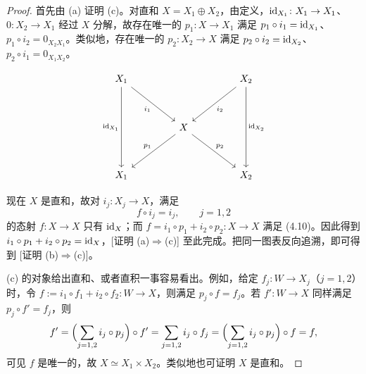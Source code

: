 \begin{proof}
首先由 (a) 证明 (c)。对直和 $X=X_1\oplus X_2$，由定义，$\mathrm{id}_{X_1}\colon X_1\to X_1$、$0\colon X_2\to X_1$ 经过 $X$ 分解，故存在唯一的 $p_1\colon X\to X_1$ 满足 $p_1\circ i_1=\mathrm{id}_{X_1}$、$p_1\circ i_2=0_{X_2X_1}$。类似地，存在唯一的 $p_2\colon X_2\to X$ 满足 $p_2\circ i_2=\mathrm{id}_{X_2}$、$p_2\circ i_1=0_{X_1X_2}$。

\[\begin{tikzcd}[row sep=3.4em, column sep=4.4em]
  X_1 \arrow[dr,"i_1"'] \arrow[dd,"\id_{X_1}"'] & & X_2 \arrow[dl,"i_2"] \arrow[dd,"\id_{X_2}"] \\
  & X \arrow[dl,"p_1"'] \arrow[dr,"p_2"] & \\
  X_1 & & X_2
\end{tikzcd}\]

现在 $X$ 是直和，故对 $i_j\colon X_j\to X$，满足
\begin{equation}
  f\circ i_j=i_j,\qquad j=1,2 \tag{4.10}
\end{equation}
的态射 $f\colon X\to X$ 只有 $\mathrm{id}_X$；而 $f=i_1\circ p_1+i_2\circ p_2\colon X\to X$ 满足 (4.10)。因此得到 $i_1\circ p_1+i_2\circ p_2=\mathrm{id}_X$，[证明 (a)$\Rightarrow$(c)] 至此完成。把同一图表反向追溯，即可得到 [证明 (b)$\Rightarrow$(c)]。

(c) 的对象给出直和、或者直积一事容易看出。例如，给定 $f_j\colon W\to X_j$（$j=1,2$）时，令 $f:=i_1\circ f_1+i_2\circ f_2\colon W\to X$，则满足 $p_j\circ f=f_j$。若 $f'\colon W\to X$ 同样满足 $p_j\circ f'=f_j$，则
\[ f'=\Bigl(\sum_{j=1,2}i_j\circ p_j\Bigr)\circ f'=\sum_{j=1,2}i_j\circ f_j=\Bigl(\sum_{j=1,2}i_j\circ p_j\Bigr)\circ f=f, \]
可见 $f$ 是唯一的，故 $X\simeq X_1\times X_2$。类似地也可证明 $X$ 是直和。
\end{proof}

